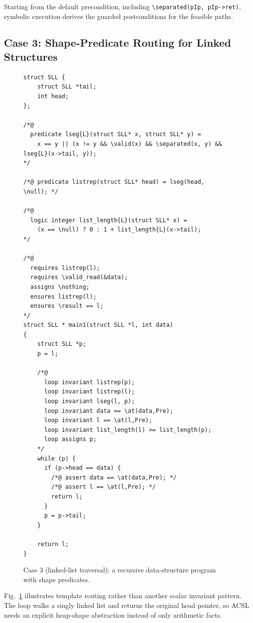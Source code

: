 {Starting from the default precondition, including \texttt{\textbackslash separated(pIp, pIp->ret)}, symbolic execution derives the guarded postconditions for the feasible paths.}
\subsection{Case 3: Shape-Predicate Routing for Linked Structures}

\begin{figure}[!t]
    \centering
    \begin{tcolorbox}[casebox, title={Case 3: route-selected shape predicates}]
\begin{lstlisting}[style=caseinnerstyle]
struct SLL {
    struct SLL *tail;
    int head;
};

/*@
  predicate lseg{L}(struct SLL* x, struct SLL* y) =
    x == y || (x != y && \valid(x) && \separated(x, y) && lseg{L}(x->tail, y));
*/

/*@ predicate listrep(struct SLL* head) = lseg(head, \null); */

/*@
  logic integer list_length{L}(struct SLL* x) =
    (x == \null) ? 0 : 1 + list_length{L}(x->tail);
*/

/*@
  requires listrep(l);
  requires \valid_read(&data);
  assigns \nothing;
  ensures listrep(l);
  ensures \result == l;
*/
struct SLL * main1(struct SLL *l, int data)
{
    struct SLL *p;
    p = l;

    /*@
      loop invariant listrep(p);
      loop invariant listrep(l);
      loop invariant lseg(l, p);
      loop invariant data == \at(data,Pre);
      loop invariant l == \at(l,Pre);
      loop invariant list_length(l) >= list_length(p);
      loop assigns p;
    */
    while (p) {
      if (p->head == data) {
        /*@ assert data == \at(data,Pre); */
        /*@ assert l == \at(l,Pre); */
        return l;
      }
      p = p->tail;
    }

    return l;
}
\end{lstlisting}
    \end{tcolorbox}
    \caption{Case 3 (linked-list traversal): a recursive data-structure program with shape predicates.}
    \label{fig:case4}
\end{figure}

Fig.~\ref{fig:case4} illustrates template routing rather than another scalar invariant pattern. The loop walks a singly linked list and returns the original head pointer, so ACSL needs an explicit heap-shape abstraction instead of only arithmetic facts.

